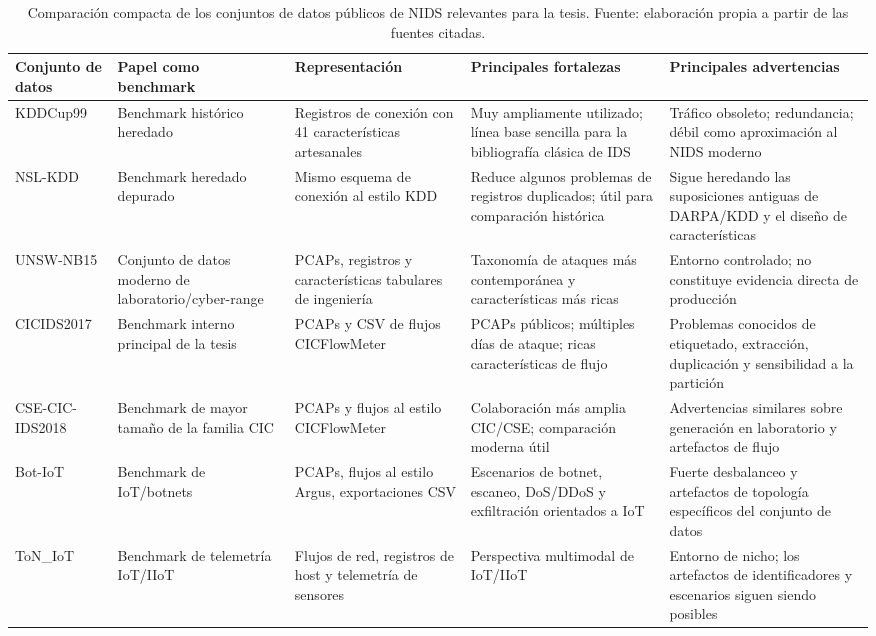 \begin{table}[htbp]
\centering
\scriptsize
\setlength{\tabcolsep}{3pt}
\begin{tabular}{p{1.85cm}p{1.9cm}p{2.45cm}p{2.65cm}p{2.8cm}}
\toprule
Conjunto de datos & Papel como benchmark & Representación & Principales fortalezas & Principales advertencias \\
\midrule
KDDCup99 & Benchmark histórico heredado & Registros de conexión con 41 características artesanales & Muy ampliamente utilizado; línea base sencilla para la bibliografía clásica de IDS \parencite{KDDCup1999} & Tráfico obsoleto; redundancia; débil como aproximación al NIDS moderno \parencite{Ring2019DatasetSurvey} \\
NSL-KDD & Benchmark heredado depurado & Mismo esquema de conexión al estilo KDD & Reduce algunos problemas de registros duplicados; útil para comparación histórica \parencite{Tavallaee2009NSLKDD} & Sigue heredando las suposiciones antiguas de DARPA/KDD y el diseño de características \\
UNSW-NB15 & Conjunto de datos moderno de laboratorio/\allowbreak cyber-range & PCAPs, registros y características tabulares de ingeniería & Taxonomía de ataques más contemporánea y características más ricas \parencite{MoustafaSlay2015UNSWNB15} & Entorno controlado; no constituye evidencia directa de producción \\
CICIDS2017 & Benchmark interno principal de la tesis & PCAPs y CSV de flujos CICFlowMeter & PCAPs públicos; múltiples días de ataque; ricas características de flujo \parencite{Sharafaldin2018CICIDS2017} & Problemas conocidos de etiquetado, extracción, duplicación y sensibilidad a la partición \parencite{Engelen2021CICIDSIssues,Lanvin2023Errors} \\
CSE-CIC-IDS2018 & Benchmark de mayor tamaño de la familia CIC & PCAPs y flujos al estilo CICFlowMeter & Colaboración más amplia CIC/CSE; comparación moderna útil \parencite{CSECICIDS2018AWS} & Advertencias similares sobre generación en laboratorio y artefactos de flujo \parencite{Liu2022ErrorPrevalenceNIDS} \\
Bot-IoT & Benchmark de IoT/botnets & PCAPs, flujos al estilo Argus, exportaciones CSV & Escenarios de botnet, escaneo, DoS/DDoS y exfiltración orientados a IoT \parencite{Koroniotis2019BotIoT} & Fuerte desbalanceo y artefactos de topología específicos del conjunto de datos \\
ToN\_IoT & Benchmark de telemetría IoT/IIoT & Flujos de red, registros de host y telemetría de sensores & Perspectiva multimodal de IoT/IIoT \parencite{Alsaedi2020ToNIoT} & Entorno de nicho; los artefactos de identificadores y escenarios siguen siendo posibles \\
\bottomrule
\end{tabular}
\caption[Comparación de conjuntos de datos públicos de NIDS]{Comparación compacta de los conjuntos de datos públicos de NIDS relevantes para la tesis. Fuente: elaboración propia a partir de las fuentes citadas.}
\label{tab:nids-datasets}
\end{table}

